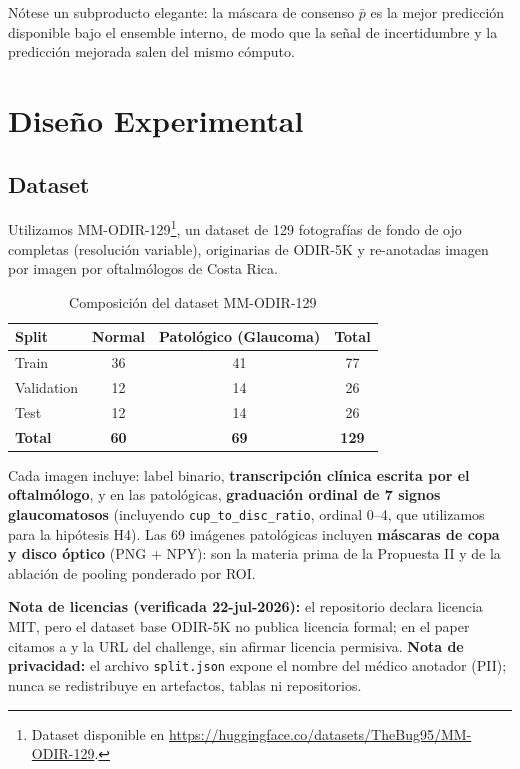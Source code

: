 \documentclass[12pt,a4paper]{article}
\begin{document}
Nótese un subproducto elegante: la máscara de consenso $\bar{p}$ es la mejor predicción disponible bajo el ensemble interno, de modo que la señal de incertidumbre y la predicción mejorada salen del mismo cómputo.

\section{Diseño Experimental}
\label{sec:diseno}

\subsection{Dataset}

Utilizamos MM-ODIR-129\footnote{Dataset disponible en \url{https://huggingface.co/datasets/TheBug95/MM-ODIR-129}.}, un dataset de 129 fotografías de fondo de ojo completas (resolución variable), originarias de ODIR-5K \citep{li2021odir} y re-anotadas imagen por imagen por oftalmólogos de Costa Rica.

\begin{table}[H]
\centering
\caption{Composición del dataset MM-ODIR-129}
\label{tab:dataset}
\begin{tabular}{lccc}
\toprule
\textbf{Split} & \textbf{Normal} & \textbf{Patológico (Glaucoma)} & \textbf{Total} \\
\midrule
Train & 36 & 41 & 77 \\
Validation & 12 & 14 & 26 \\
Test & 12 & 14 & 26 \\
\midrule
\textbf{Total} & \textbf{60} & \textbf{69} & \textbf{129} \\
\bottomrule
\end{tabular}
\end{table}

Cada imagen incluye: label binario, \textbf{transcripción clínica escrita por el oftalmólogo}, y en las patológicas, \textbf{graduación ordinal de 7 signos glaucomatosos} (incluyendo \texttt{cup\_to\_disc\_ratio}, ordinal 0--4, que utilizamos para la hipótesis H4).
Las 69 imágenes patológicas incluyen \textbf{máscaras de copa y disco óptico} (PNG + NPY): son la materia prima de la Propuesta II y de la ablación de pooling ponderado por ROI.

\textbf{Nota de licencias (verificada 22-jul-2026):} el repositorio declara licencia MIT, pero el dataset base ODIR-5K no publica licencia formal; en el paper citamos a \citet{li2021odir} y la URL del challenge, sin afirmar licencia permisiva.
\textbf{Nota de privacidad:} el archivo \texttt{split.json} expone el nombre del médico anotador (PII); nunca se redistribuye en artefactos, tablas ni repositorios.
\end{document}
